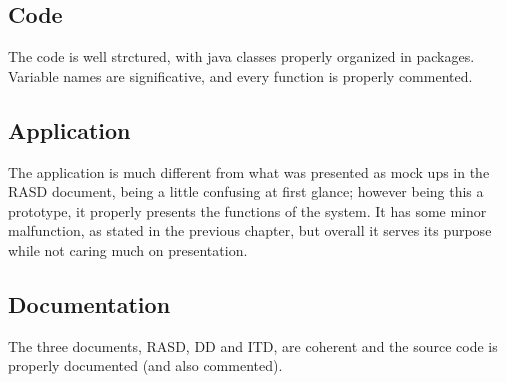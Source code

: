 \documentclass[../main.tex]{subfiles}
\begin{document}
\subsection{Code}

The code is well strctured, with java classes properly organized in packages. Variable names are significative, and every function is properly commented.

\subsection{Application}

The application is much different from what was presented as mock ups in the RASD document, being a little confusing at first glance; however being this a prototype, it properly presents the functions of the system. It has some minor malfunction, as stated in the previous chapter, but overall it serves its purpose while not caring much on presentation.

\subsection{Documentation}

The three documents, RASD, DD and ITD, are coherent and the source code is properly documented (and also commented).
\end{document}
